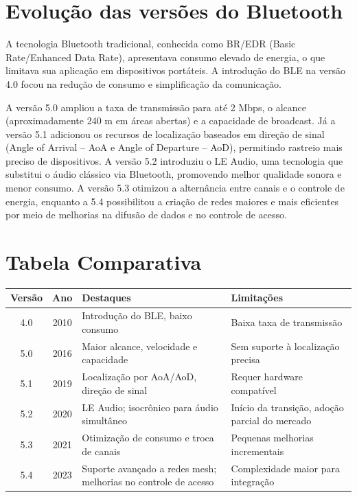 \documentclass[12pt,a4paper]{report}
\begin{document}
\chapter{Evolução das versões do Bluetooth}
A tecnologia Bluetooth tradicional, conhecida como BR/EDR (Basic Rate/Enhanced Data Rate), apresentava consumo elevado de energia, o que limitava sua aplicação em dispositivos portáteis. A introdução do BLE na versão 4.0 focou na redução de consumo e simplificação da comunicação.

A versão 5.0 ampliou a taxa de transmissão para até 2 Mbps, o alcance (aproximadamente 240 m em áreas abertas) e a capacidade de broadcast. Já a versão 5.1 adicionou os recursos de localização baseados em direção de sinal (Angle of Arrival -- AoA e Angle of Departure -- AoD), permitindo rastreio mais preciso de dispositivos. A versão 5.2 introduziu o LE Audio, uma tecnologia que substitui o áudio clássico via Bluetooth, promovendo melhor qualidade sonora e menor consumo. A versão 5.3 otimizou a alternância entre canais e o controle de energia, enquanto a 5.4 possibilitou a criação de redes maiores e mais eficientes por meio de melhorias na difusão de dados e no controle de acesso.

\chapter{Tabela Comparativa}
\begin{longtable}{|c|c|p{6.5cm}|p{6.5cm}|}
\hline
\textbf{Versão} & \textbf{Ano} & \textbf{Destaques} & \textbf{Limitações} \\ \hline
4.0 & 2010 & Introdução do BLE, baixo consumo & Baixa taxa de transmissão \\ \hline
5.0 & 2016 & Maior alcance, velocidade e capacidade & Sem suporte à localização precisa \\ \hline
5.1 & 2019 & Localização por AoA/AoD, direção de sinal & Requer hardware compatível \\ \hline
5.2 & 2020 & LE Audio; isocrônico para áudio simultâneo & Início da transição, adoção parcial do mercado \\ \hline
5.3 & 2021 & Otimização de consumo e troca de canais & Pequenas melhorias incrementais \\ \hline
5.4 & 2023 & Suporte avançado a redes mesh; melhorias no controle de acesso & Complexidade maior para integração \\ \hline
\end{longtable}
\end{document}
